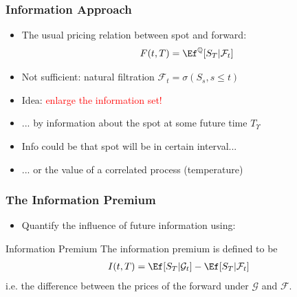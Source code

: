 \begin{frame}
  \frametitle{Information Approach}
\vspace{-0.5cm}

\begin{itemize}
\item The usual pricing relation between spot and forward:
\begin{align*}
F(t,T)=\Ef^\mathbb{Q}[S_T|\mathcal{F}_t]
\end{align*}
\item Not sufficient: natural filtration $\mathcal{F}_t = \sigma(S_s, s\leq t)$
\vspace{0.5cm}
\pause
\item Idea: \textcolor{red}{enlarge the information set!}
\vspace{0.5cm}
\pause
\item ... by information about the spot at some future time $T_\Upsilon$
\item Info could be that spot will be in certain interval...
\item ... or the value of a correlated process (temperature)
\end{itemize}
\end{frame}


\begin{frame}
  \frametitle{The Information Premium}
\vspace{-0.5cm}

\begin{itemize}
\item Quantify the influence of future information using:
\end{itemize}
\begin{block}{Information Premium}
The information premium is defined to be
\begin{align*}
I(t,T) = \Ef[S_T | \mathcal{G}_t] - \Ef[S_T | \mathcal{F}_t]
\end{align*}
i.e. the difference between the prices of the forward under $\mathcal{G}$ and $\mathcal{F}$.
\end{block}
\end{frame}














